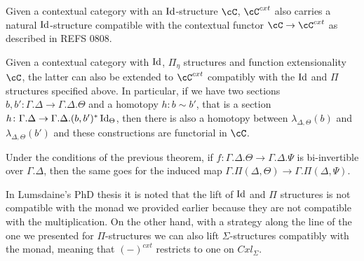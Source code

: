 \documentclass[a4paper,fontsize=12pt]{scrartcl}
\begin{document}
\begin{prop}\cite[Prop.\ 3.3.1]{Gar09b}
  Given a contextual category with an $\operatorname{Id}$-structure $\cC$, $\cC^{cxt}$ also
  carries a natural $\operatorname{Id}$-structure compatible with the contextual functor
  $\cC\rightarrow\cC^{cxt}$ as described in REFS 0808.
\end{prop}

\begin{lem}\cite[Lemma 2.28]{1808}
  Given a contextual category with $\operatorname{Id}$, $\Pi_\eta$ structures and function
  extensionality $\cC$, the latter can also be extended to $\cC^{cxt}$
  compatibly with the $\operatorname{Id}$ and $\Pi$ structures specified above. In particular,
  if we have two sections
  $b,b'\colon\Gamma.\Delta\rightarrow\Gamma.\Delta.\Theta$ and a homotopy
  $h:b\sim b'$, that is a section
  $h\colon\Gamma.\Delta\rightarrow\Gamma.\Delta.(b,b')^*\operatorname{Id}_{\Theta}$,
  then there is also a homotopy between $\lambda_{\Delta,\Theta}(b)$ and
  $\lambda_{\Delta,\Theta}(b')$ and these constructions are functorial in $\cC$.
\end{lem}

\begin{cor}\cite[Lemma 2.29]{1808}
  Under the conditions of the previous theorem, if
  $f\colon\Gamma.\Delta.\Theta\rightarrow\Gamma.\Delta.\Psi$ is
  bi-invertible over $\Gamma.\Delta$, then the same goes for the induced map
  $\Gamma.\Pi(\Delta,\Theta)\rightarrow\Gamma.\Pi(\Delta,\Psi)$.
\end{cor}



\begin{rmk}
  In Lumsdaine's PhD thesis it is noted that the lift of $\operatorname{Id}$ and $\Pi$
  structures is not compatible with the monad we provided earlier because they
  are not compatible with the multiplication. On the other
  hand, with a strategy along the line of the one we presented for
  $\Pi$-structures we can also lift $\Sigma$-structures compatibly with the
  monad, meaning that $(-)^{cxt}$ restricts to one on $Cxl_\Sigma$.
\end{rmk}
\end{document}
